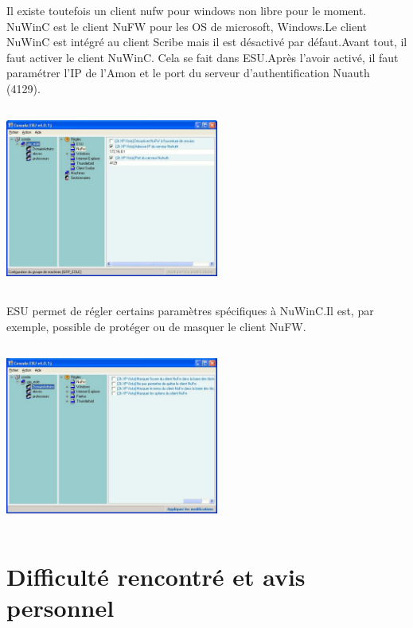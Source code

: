 \documentclass[12pt]{report}
\begin{document}
\begin{itemize}
\vspace{0,7cm}
Il existe toutefois un client nufw pour windows non libre pour le moment. NuWinC est le client NuFW pour les OS de microsoft, Windows.Le client NuWinC est intégré au client Scribe mais il est désactivé par défaut.Avant tout, il faut activer le client NuWinC. Cela se fait dans ESU.Après l'avoir activé, il faut paramétrer l'IP de l'Amon et le port du serveur d'authentification Nuauth (4129).
\begin{center}
  \includegraphics[width=7cm,height=6cm]{images/nuwinc.png}
\end{center}
\newpage
ESU permet de régler certains paramètres spécifiques à NuWinC.Il est, par exemple, possible de protéger ou de masquer le client NuFW.
\begin{center}
  \includegraphics[width=7cm,height=6cm]{images/nuwinc1.png}
\end{center}

\chapter{Difficulté rencontré et avis personnel}

\end{itemize}
\end{document}
